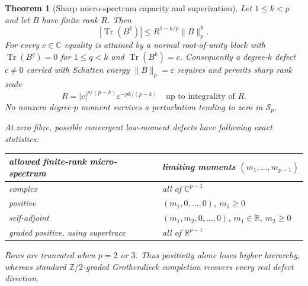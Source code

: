 \documentclass[11pt]{article}
\newtheorem{theorem}{Theorem}[section]
\theoremstyle{definition}
\theoremstyle{remark}
\newcommand{\R}{\mathbb R}
\newcommand{\C}{\mathbb C}
\newcommand{\Tr}{\operatorname{Tr}}
\newcommand{\norm}[1]{\lVert #1\rVert}
\begin{document}
\begin{theorem}[Sharp micro-spectrum capacity and superization]
\label{thm:micro-spectrum}
Let $1\leq k<p$ and let $B$ have finite rank $R$.  Then
\begin{equation}
 |\Tr(B^k)|\leq R^{1-k/p}\norm{B}_p^k.                    \tag{1.E}
\end{equation}
For every $c\in\C$ equality is attained by a normal root-of-unity block with
$\Tr(B^q)=0$ for $1\leq q<k$ and $\Tr(B^k)=c$.  Consequently a degree-$k$ defect $c\neq0$
carried with Schatten energy $\norm{B}_p=\varepsilon$ requires and permits sharp rank scale
\begin{equation}
 R=|c|^{p/(p-k)}\varepsilon^{-pk/(p-k)}
 \quad\text{up to integrality of }R.                      \tag{1.R}
\end{equation}
No nonzero degree-$p$ moment survives a perturbation tending to zero in $\mathcal S_p$.

At zero fibre, possible convergent low-moment defects have following exact statistics:
\begin{center}
\begin{tabular}{ll}
\toprule
allowed finite-rank micro-spectrum & limiting moments $(m_1,\ldots,m_{p-1})$\\
\midrule
complex & all of $\C^{p-1}$\\
positive & $(m_1,0,\ldots,0)$, $m_1\geq0$\\
self-adjoint & $(m_1,m_2,0,\ldots,0)$, $m_1\in\R$, $m_2\geq0$\\
graded positive, using supertrace & all of $\R^{p-1}$\\
\bottomrule
\end{tabular}
\end{center}
Rows are truncated when $p=2$ or $3$.  Thus positivity alone loses higher hierarchy, whereas
standard $\mathbb Z/2$-graded Grothendieck completion recovers every real defect direction.
\end{theorem}
\end{document}
